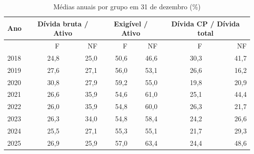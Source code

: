 \begin{table}[htb]
\caption{Médias anuais por grupo em 31 de dezembro (\%)}\label{tab:anuais}
\centering\footnotesize\setlength{\tabcolsep}{4pt}
\begin{tabular}{lrrrrrr}
\toprule
Ano & \multicolumn{2}{c}{Dívida bruta / Ativo} & \multicolumn{2}{c}{Exigível / Ativo} & \multicolumn{2}{c}{Dívida CP / Dívida total} \\
\midrule
 & F & NF & F & NF & F & NF \\
2018 & 24,8 & 25,0 & 50,6 & 46,6 & 30,3 & 41,7 \\
2019 & 27,6 & 27,1 & 56,0 & 53,1 & 26,6 & 16,2 \\
2020 & 30,8 & 27,9 & 59,2 & 55,0 & 19,8 & 20,9 \\
2021 & 26,6 & 35,9 & 54,6 & 61,0 & 25,1 & 44,4 \\
2022 & 26,0 & 35,9 & 54,8 & 60,0 & 26,3 & 21,7 \\
2023 & 26,3 & 34,0 & 54,8 & 58,4 & 24,2 & 26,6 \\
2024 & 25,5 & 27,1 & 55,3 & 55,1 & 21,7 & 29,3 \\
2025 & 26,9 & 25,9 & 57,0 & 63,4 & 24,4 & 48,6 \\
\bottomrule
\end{tabular}
\end{table}
